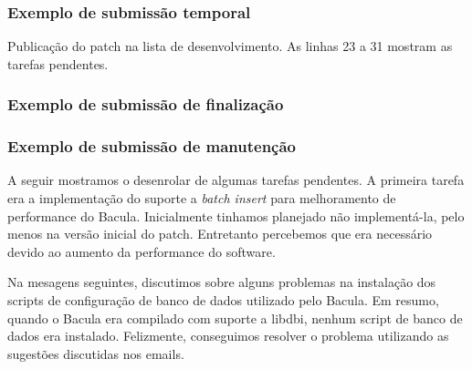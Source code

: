 \subsubsection{Exemplo de submissão temporal}\label{sec:anexod:submissaotemporal}
Publicação do patch \patchshort na lista de desenvolvimento. As linhas 23 a 31 mostram as tarefas pendentes.

%
\subsubsection{Exemplo de submissão de finalização}\label{sec:anexod:submissaofinal}
\subsubsection{Exemplo de submissão de manutenção}\label{sec:anexod:submissaomanutencao}
A seguir mostramos o desenrolar de algumas tarefas pendentes. A primeira tarefa era a implementação do suporte a \textit{batch insert} para melhoramento de performance do Bacula. Inicialmente tinhamos planejado não implementá-la, pelo menos na versão inicial do patch. Entretanto percebemos que era necessário devido ao aumento da performance do software.

Na mesagens seguintes, discutimos sobre alguns problemas na instalação dos scripts de configuração de banco de dados utilizado pelo Bacula. Em resumo, quando o Bacula era compilado com suporte a libdbi, nenhum script de banco de dados era instalado. Felizmente, conseguimos resolver o problema utilizando as sugestões discutidas nos emails.




